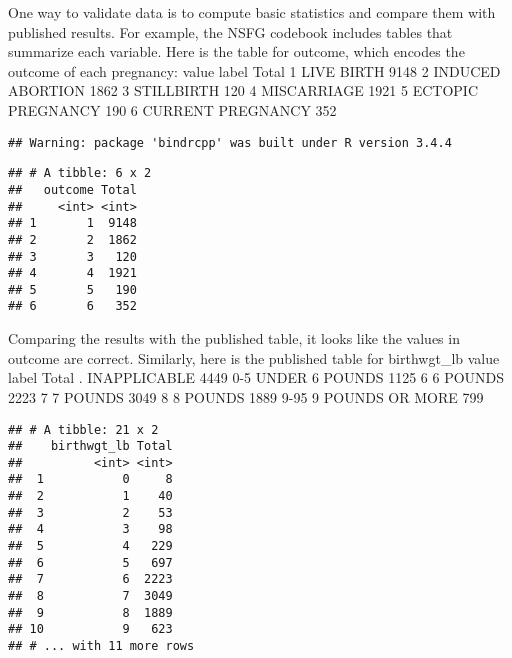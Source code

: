 \documentclass[]{article}
\newenvironment{Shaded}{\begin{snugshade}}{\end{snugshade}}
\newcommand{\KeywordTok}[1]{\textcolor[rgb]{0.13,0.29,0.53}{\textbf{#1}}}
\newcommand{\DataTypeTok}[1]{\textcolor[rgb]{0.13,0.29,0.53}{#1}}
\newcommand{\StringTok}[1]{\textcolor[rgb]{0.31,0.60,0.02}{#1}}
\newcommand{\OperatorTok}[1]{\textcolor[rgb]{0.81,0.36,0.00}{\textbf{#1}}}
\newcommand{\NormalTok}[1]{#1}
\begin{document}
One way to validate data is to compute basic statistics and compare them
with published results. For example, the NSFG codebook includes tables
that summarize each variable. Here is the table for outcome, which
encodes the outcome of each pregnancy: value label Total 1 LIVE BIRTH
9148 2 INDUCED ABORTION 1862 3 STILLBIRTH 120 4 MISCARRIAGE 1921 5
ECTOPIC PREGNANCY 190 6 CURRENT PREGNANCY 352

\begin{Shaded}
\end{Shaded}

\begin{verbatim}
## Warning: package 'bindrcpp' was built under R version 3.4.4
\end{verbatim}

\begin{verbatim}
## # A tibble: 6 x 2
##   outcome Total
##     <int> <int>
## 1       1  9148
## 2       2  1862
## 3       3   120
## 4       4  1921
## 5       5   190
## 6       6   352
\end{verbatim}

Comparing the results with the published table, it looks like the values
in outcome are correct. Similarly, here is the published table for
birthwgt\_lb value label Total . INAPPLICABLE 4449 0-5 UNDER 6 POUNDS
1125 6 6 POUNDS 2223 7 7 POUNDS 3049 8 8 POUNDS 1889 9-95 9 POUNDS OR
MORE 799

\begin{Shaded}
\end{Shaded}

\begin{verbatim}
## # A tibble: 21 x 2
##    birthwgt_lb Total
##          <int> <int>
##  1           0     8
##  2           1    40
##  3           2    53
##  4           3    98
##  5           4   229
##  6           5   697
##  7           6  2223
##  8           7  3049
##  9           8  1889
## 10           9   623
## # ... with 11 more rows
\end{verbatim}
\end{document}
